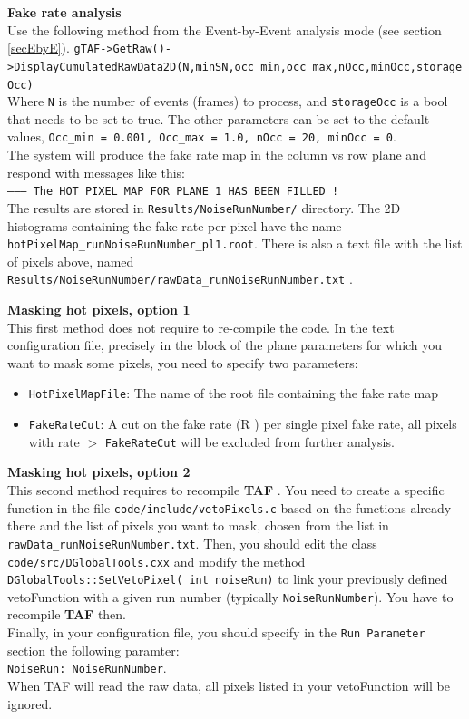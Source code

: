 \documentclass[a4paper, 12pt, twoside]{article}
\newcommand{\TAF}{{\bf TAF }}
\begin{document}
\noindent
{\bf Fake rate analysis}\\

\noindent
Use the following method from the Event-by-Event analysis mode (see section \ref{secEbyE}).
{\tt gTAF->GetRaw()->DisplayCumulatedRawData2D(N,minSN,occ\_min,occ\_max,nOcc,minOcc,storageOcc)}\\
 Where {\tt N} is the number of events (frames) to process, and {\tt storageOcc} is a bool that needs to be set to true. The other parameters can be set to the default values, {\tt Occ\_min = 0.001, Occ\_max = 1.0, nOcc = 20, minOcc = 0}.\\
 The system will produce the fake rate map in the column vs row plane and respond with messages like this:\\
{\tt -------- The HOT PIXEL MAP FOR PLANE 1 HAS BEEN FILLED !}\\
The results are stored in {\tt Results/NoiseRunNumber/} directory. The 2D histograms containing the fake rate per pixel have the name {\tt hotPixelMap\_runNoiseRunNumber\_pl1.root}. There is also a text file with the list of pixels above, named {\tt Results/NoiseRunNumber/rawData\_runNoiseRunNumber.txt} .

\noindent
{\bf Masking hot pixels, option 1}\\

\noindent
This first method does not require to re-compile the code. In the text configuration file, precisely in the block of the plane parameters for which you want to mask some pixels, you need to specify two parameters:\\
\begin{itemize}
\item {\tt HotPixelMapFile}: The name of the root file containing the fake rate map
\item {\tt FakeRateCut}: A cut on the fake rate (R ) per single pixel fake rate, all pixels with rate $>$ {\tt FakeRateCut} will be excluded from further analysis.
\end{itemize}

\noindent
{\bf Masking hot pixels, option 2}\\

\noindent
This second method requires to recompile \TAF. You need to create a specific function in the file {\tt  code/include/vetoPixels.c} based on the functions already there and the list of pixels you want to mask, chosen from the list in {\tt rawData\_runNoiseRunNumber.txt}. Then, you should edit the class {\tt code/src/DGlobalTools.cxx} and modify the method {\tt DGlobalTools::SetVetoPixel( int noiseRun)} to link your previously defined vetoFunction with a given run number (typically {\tt NoiseRunNumber}). You have to recompile \TAF then.\\
Finally, in your configuration file, you should specify in the {\tt Run Parameter} section the following paramter:\\
{\tt NoiseRun: NoiseRunNumber}.\\
When TAF will read the raw data, all pixels listed in your vetoFunction will be ignored.
\end{document}
